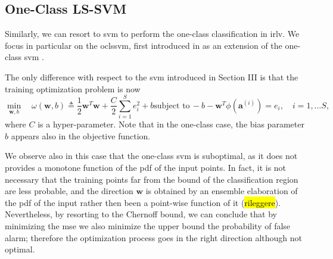 \documentclass[draftcls,onecolumn,12pt]{IEEEtran}
\begin{document}
\subsection{One-Class LS-SVM}

Similarly, we can resort to \ac{svm} to perform the one-class classification in \ac{irlv}. We focus in particular on the  \ac{oclssvm}, first introduced in \cite{choi2009least} as an extension of the one-class \ac{svm} \cite{Scholkopf2001estimating}. 

The only difference with respect to the \ac{svm} introduced in Section III is that the training optimization problem is now
\begin{subequations}
	\label{eq:oneClassSvm}
	\begin{equation}
	\label{eq:oneClass1}
	\underset{\bm{w},b}{\min} \quad \omega(\bm{w}, b) \triangleq
	 \frac{1}{2} \bm{w}^T \bm{w} +  \frac{C}{2} \sum_{i=1}^S e_i^2 +b
	\end{equation}
	\begin{equation}
	\label{eq:oneClassConstr}
	\text{subject to}\, -b - \bm{w}^T \phi (\bm{a}^{(i)})  = e_i,  \quad i = 1,\dots S, 
	\end{equation}
\end{subequations}
where $C$ is a hyper-parameter.
Note that in the one-class case, the bias parameter $b$ appears also in the objective function.


We observe also in this case that the one-class \ac{svm} is suboptimal, as it does not provides a monotone function of the \ac{pdf} of the input points. In fact, it is not necessary that the training points far from the bound of the classification region are less probable, and the direction $\bm{w}$ is obtained by an ensemble elaboration of the \ac{pdf} of the input rather then been a point-wise function of it (\hl{rileggere}). Nevertheless, by resorting to the Chernoff bound, we can conclude that by minimizing the \ac{mse} we also minimize the upper bound the probability of false alarm; therefore the optimization process goes in the right direction although not optimal.
\end{document}
